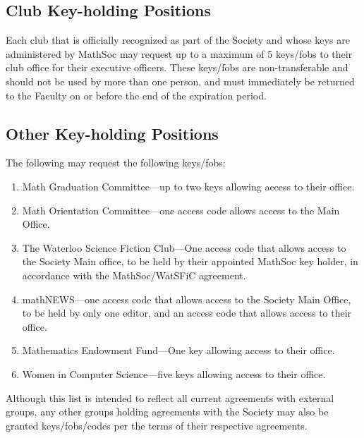 \subsection{Club Key-holding Positions}
Each club that is officially recognized as part of the Society and whose keys
are administered by MathSoc may request up to a maximum of 5 keys/fobs to their
club office for their executive officers. These keys/fobs are non-transferable
and should not be used by more than one person, and must immediately be
returned to the Faculty on or before the end of the expiration period.

\subsection{Other Key-holding Positions}
The following may request the following keys/fobs:
\begin{enumerate}
  \item Math Graduation Committee---up to two keys allowing access to their office.
  \item Math Orientation Committee---one access code allows access to the Main Office.
  \item The Waterloo Science Fiction Club---One access code that allows access to the
    Society Main office, to be held by their appointed MathSoc key holder, in
    accordance with the MathSoc/WatSFiC agreement.
  \item mathNEWS---one access code that allows access to the Society Main Office, to be held by only one editor, and an access code that allows access to their office.
  \item Mathematics Endowment Fund---One key allowing access to their office.
  \item Women in Computer Science---five keys allowing access to their office.
\end{enumerate}

Although this list is intended to reflect all current agreements with external groups, any other groups holding agreements with the Society may also be granted keys/fobs/codes per the terms of their respective agreements.
